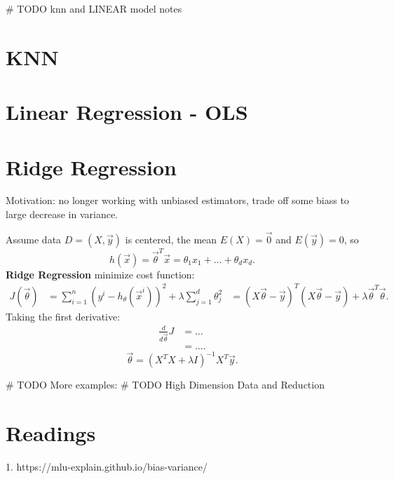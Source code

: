 \documentclass[a4paper]{article}
\begin{document}
  # TODO knn and LINEAR model notes
  \section{KNN}

  \section{Linear Regression - OLS}

  \section{Ridge Regression}
  Motivation: no longer working with unbiased estimators, trade off some biass to large decrease in variance.
  
  \begin{definition}
    Assume data $D = (X, \vec{y})$ is centered, the mean $E(X) = \vec{0}$ and $E(\vec{y}) = 0$, so 
    \[
      h(\vec{x}) = \vec{\theta}^T \vec{x} = \theta_1 x_1 + \ldots + \theta_d x_d
    .\] 
    \textbf{Ridge Regression} minimize cost function:
    \begin{align*}
      J(\vec{\theta}) &= \sum_{i=1}^n (y^i - h_\theta (\vec{x}^i))^2 + \lambda \sum_{j=1}^d \theta_j^2
                      &= (X \vec{\theta} - \vec{y})^T (X \vec{\theta} - \vec{y}) + \lambda \vec{\theta}^T \vec{\theta}
    .\end{align*}
    Taking the first derivative:
    \begin{align*}
      \frac{d}{d \vec{\theta}} J &= \ldots \\
                                 &= \ldots
    .\end{align*}
    \[
      \vec{\theta} = (X^T X + \lambda I)^{-1} X^T \vec{y}
    .\] 
  \end{definition}
  
  # TODO More examples:
  # TODO High Dimension Data and Reduction

  \section{Readings}
  1. https://mlu-explain.github.io/bias-variance/
\end{document}
